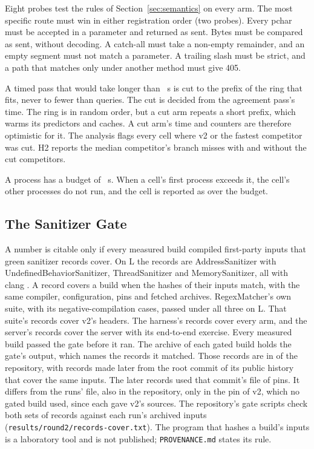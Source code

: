 Eight probes test the rules of Section~\ref{sec:semantics} on every arm. The most specific route
must win in either registration order (two probes). Every pchar must be accepted in a parameter and
returned as sent. Bytes must be compared as sent, without decoding. A catch-all must take a non-empty
remainder, and an empty segment must not match a parameter. A trailing slash must be strict, and a
path that matches only under another method must give 405.

 A timed pass that would take longer than \PassBudgetSeconds~s is
cut to the prefix of the ring that fits, never to fewer than \PassMinQueries{} queries. The cut is
decided from the agreement pass's time. The ring is in random order, but a cut arm repeats a short
prefix, which warms its predictors and caches. A cut arm's time and counters are therefore optimistic
for it. The analysis flags every cell where v2 or the fastest competitor was cut. H2 reports the
median competitor's branch misses with and without the cut competitors.

 A process has a budget of \ProcessBudgetSeconds~s. When a cell's first process
exceeds it, the cell's other processes do not run, and the cell is reported as over the budget.

\subsection{The Sanitizer Gate}\label{sec:gate}

A number is citable only if every measured build compiled first-party inputs that green sanitizer
records cover. On L the records are AddressSanitizer with UndefinedBehaviorSanitizer,
ThreadSanitizer and MemorySanitizer, all with clang \ClangVersion. A record covers a build when the
hashes of their inputs match, with the same compiler, configuration, pins and fetched archives.
RegexMatcher's own suite, with its negative-compilation cases, passed under all three on L. That
suite's records cover v2's headers. The harness's records cover every arm, and the server's records
cover the server with its end-to-end exercise. Every measured build passed the gate before it ran.
The archive of each gated build holds the gate's output, which names the records it matched. Those
records are in \RecordsDir{} of the repository, with records made later from the root commit of its
public history that cover the same inputs. The later records used that commit's file of pins.
It differs from the runs' file, also in the repository, only in the pin of v2, which no gated build
used, since each gave v2's sources. The repository's gate scripts check both sets of records against
each run's archived inputs (\texttt{results/round2/records-cover.txt}). The program that hashes a
build's inputs is a laboratory tool and is not published; \texttt{PROVENANCE.md} states its rule.

